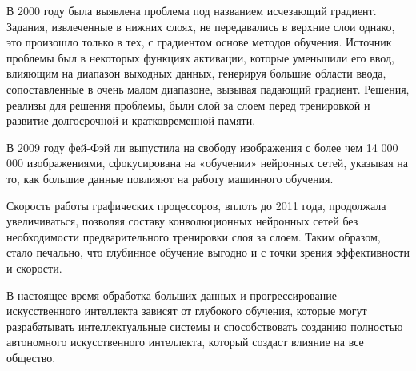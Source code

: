  В 2000 году была выявлена проблема под названием исчезающий градиент. 
 Задания, извлеченные в нижних слоях, не передавались в верхние слои однако,
 это произошло только в тех, с градиентом основе методов обучения. 
 Источник проблемы был в некоторых функциях активации, которые уменьшили его ввод,
 влияющим на диапазон выходных данных, генерируя большие области ввода,
 сопоставленные в очень малом диапазоне, вызывая падающий градиент. 
 Решения, реализы для решения проблемы, были слой за слоем перед 
 тренировкой и развитие долгосрочной и кратковременной памяти.

 В 2009 году фей-Фэй ли выпустила на свободу изображения
 с более чем 14 000 000 изображениями,
 сфокусирована на «обучении» нейронных сетей, указывая на то, 
 как большие данные повлияют на работу машинного обучения. 

 Скорость работы графических процессоров, вплоть до 2011 года, 
 продолжала увеличиваться, позволяя составу конволюционных нейронных 
 сетей без необходимости предварительного тренировки слоя за слоем. 
 Таким образом, стало печально, что глубинное обучение выгодно и
 с точки зрения эффективности и скорости. 

 В настоящее время обработка больших данных и прогрессирование искусственного интеллекта зависят от глубокого обучения, 
 которые могут разрабатывать интеллектуальные системы и способствовать созданию полностью автономного искусственного интеллекта, 
 который создаст влияние на все общество.